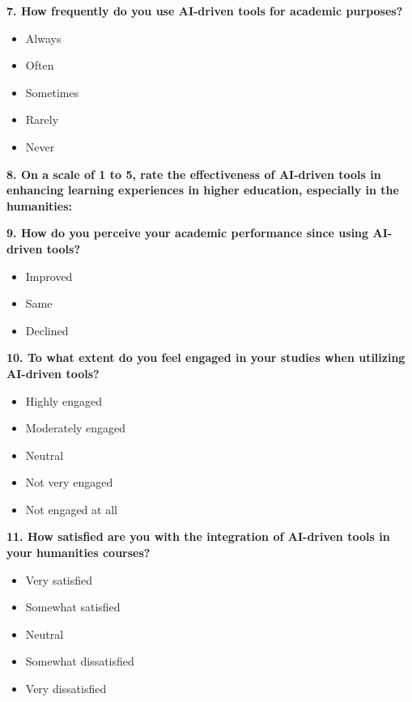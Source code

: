 \noindent\textbf{7.  How frequently do you use AI-driven tools for academic purposes?}
\begin{itemize}
	\item[\circlebox] Always
	\item[\circlebox] Often
	\item[\circlebox] Sometimes
	\item[\circlebox] Rarely
	\item[\circlebox] Never
\end{itemize}

\noindent\textbf{8. On a scale of 1 to 5, rate the effectiveness of AI-driven tools in enhancing learning experiences in higher education, especially in the humanities:}

\bigskip
\begin{Center}
\end{Center}


\noindent\textbf{9.  How do you perceive your academic performance since using AI-driven tools?}
\begin{itemize}
	\item[\circlebox] Improved
	\item[\circlebox] Same
	\item[\circlebox] Declined
\end{itemize}


\noindent\textbf{10. To what extent do you feel engaged in your studies when utilizing AI-driven tools?}
\begin{itemize}
	\item[\circlebox] Highly engaged
	\item[\circlebox] Moderately engaged
	\item[\circlebox] Neutral
	\item[\circlebox] Not very engaged
	\item[\circlebox] Not engaged at all
\end{itemize}

\noindent\textbf{11. How satisfied are you with the integration of AI-driven tools in your humanities courses?}
\begin{itemize}
	\item[\circlebox] Very satisfied
	\item[\circlebox] Somewhat satisfied
	\item[\circlebox] Neutral
	\item[\circlebox] Somewhat dissatisfied
	\item[\circlebox] Very dissatisfied
\end{itemize}

